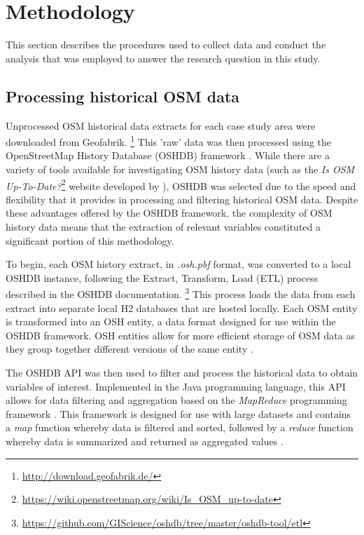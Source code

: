 \chapter{Methodology}
\label{chapterlabel4}

This section describes the procedures used to collect data and conduct the analysis that was employed to answer the research question in this study. 

\section{Processing historical OSM data}

Unprocessed OSM historical data extracts for each case study area were downloaded from Geofabrik. \footnote{\url{http://download.geofabrik.de/}} This 'raw' data was then processed using the OpenStreetMap History Database (OSHDB) framework \parencite{raifer_oshdb_2019}. While there are a variety of tools available for investigating OSM history data (such as the \textit{Is OSM Up-To-Date?}\footnote{\url{https://wiki.openstreetmap.org/wiki/Is_OSM_up-to-date}} website developed by \textcite{minghini_open_2018}), OSHDB was selected due to the speed and flexibility that it provides in processing and filtering historical OSM data. Despite these advantages offered by the OSHDB framework, the complexity of OSM history data means that the extraction of relevant variables constituted a significant portion of this methodology. 

To begin, each OSM history extract, in \textit{.osh.pbf} format, was converted to a local OSHDB instance, following the Extract, Transform, Load (ETL) process described in the OSHDB documentation. \footnote{\url{https://github.com/GIScience/oshdb/tree/master/oshdb-tool/etl}} This process loads the data from each extract into separate local H2 databases that are hosted locally. Each OSM entity is transformed into an OSH entity, a data format designed for use within the OSHDB framework. OSH entities allow for more efficient storage of OSM data as they group together different versions of the same entity \parencite{raifer_oshdb_2019}. 

The OSHDB API \parencite{raifer_oshdb_2019} was then used to filter and process the historical data to obtain variables of interest.  Implemented in the Java programming language, this API allows for data filtering and aggregation based on the \textit{MapReduce} programming framework \parencite{raifer_oshdb_2019}. This framework is designed for use with large datasets and contains a \textit{map} function whereby data is filtered and sorted, followed by a \textit{reduce} function whereby data is summarized and returned as aggregated values \parencite{dean_mapreduce_2008}. 

